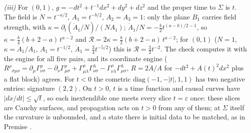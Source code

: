 \emph{(iii)} For $(0, 1)$, $g = -dt^{2} + t^{-1}dx^{2} + dy^{2} + dz^{2}$ and the proper time to $\Sigma$ is $t$. The field is $N = t^{-a/2}$, $A_{1} = t^{-b/2}$, $A_{2} = A_{3} = 1$: only the plane $B_{1}$ carries field strength, with $\kappa = \partial_{t}(\dot A_{1}/N)/(NA_{1})$; $\dot A_{1}/N = -\tfrac{b}{2}t^{(a - b)/2 - 1}$, so $\kappa = \tfrac{b}{4}(b + 2 - a)\,t^{a - 2}$ and $\mathcal{R} = 2\kappa = \tfrac{b}{2}(b + 2 - a)\,t^{a - 2}$; for $(0, 1)$ ($N = 1$, $\kappa = \ddot A_{1}/A_{1}$, $A_{1} = t^{-1/2}$, $\ddot A_{1} = \tfrac34 t^{-5/2}$) this is $\mathcal{R} = \tfrac32 t^{-2}$. The check computes it with the engine for all five pairs, and its coordinate engine ($R^{\rho}{}_{\sigma\mu\nu} = \partial_{\mu}\Gamma^{\rho}_{\nu\sigma} - \partial_{\nu}\Gamma^{\rho}_{\mu\sigma} + \Gamma^{\rho}_{\mu\lambda}\Gamma^{\lambda}_{\nu\sigma} - \Gamma^{\rho}_{\nu\lambda}\Gamma^{\lambda}_{\mu\sigma}$, $R = 2\ddot A/A$ for $-dt^{2} + A(t)^{2}dx^{2}$ plus a flat block) agrees. For $t < 0$ the cometric $\mathrm{diag}(-1, -|t|, 1, 1)$ has two negative entries: signature $(2, 2)$. On $t > 0$, $t$ is a time function and causal curves have $|dx/dt| \le \sqrt{t}$, so each inextendible one meets every slice $t = \varepsilon$ once: these slices are Cauchy surfaces, and propagation acts on $t > 0$ from any of them; at $\Sigma$ itself the curvature is unbounded, and a state there is initial data to be matched, as in Premise .

